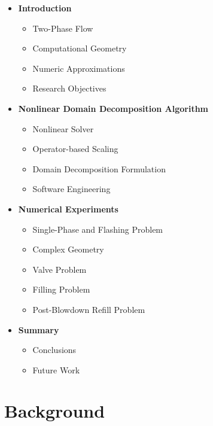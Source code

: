 \documentclass[compress,xcolor=table]{beamer}
\begin{document}
\begin{frame}

\begin{itemize}
\item{\textbf{Introduction}
\begin{itemize}
\item{Two-Phase Flow}
\item{Computational Geometry}
\item{Numeric Approximations}
\item{Research Objectives}
\end{itemize}
}
\item{\textbf{Nonlinear Domain Decomposition Algorithm}
\begin{itemize}
\item{Nonlinear Solver}
\item{Operator-based Scaling}
\item{Domain Decomposition Formulation}
\item{Software Engineering}
\end{itemize}
}
\item{\textbf{Numerical Experiments}
\begin{itemize}
\item{Single-Phase and Flashing Problem}
\item{Complex Geometry}
\item{Valve Problem}
\item{Filling Problem}
\item{Post-Blowdown Refill Problem}
\end{itemize}
}
\item{\textbf{Summary}
\begin{itemize}
\item{Conclusions}
\item{Future Work}
\end{itemize}
}
\end{itemize}

\end{frame}
\section[Background]{Background}
\end{document}
